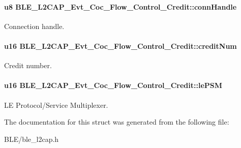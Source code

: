 \paragraph[{\texorpdfstring{conn\+Handle}{connHandle}}]{\setlength{\rightskip}{0pt plus 5cm}u8 B\+L\+E\+\_\+\+L2\+C\+A\+P\+\_\+\+Evt\+\_\+\+Coc\+\_\+\+Flow\+\_\+\+Control\+\_\+\+Credit\+::conn\+Handle}\hypertarget{struct_b_l_e___l2_c_a_p___evt___coc___flow___control___credit_aa290bb033e321b63549b47bf80be1311}{}\label{struct_b_l_e___l2_c_a_p___evt___coc___flow___control___credit_aa290bb033e321b63549b47bf80be1311}
Connection handle. 
\paragraph[{\texorpdfstring{credit\+Num}{creditNum}}]{\setlength{\rightskip}{0pt plus 5cm}u16 B\+L\+E\+\_\+\+L2\+C\+A\+P\+\_\+\+Evt\+\_\+\+Coc\+\_\+\+Flow\+\_\+\+Control\+\_\+\+Credit\+::credit\+Num}\hypertarget{struct_b_l_e___l2_c_a_p___evt___coc___flow___control___credit_ab43d71b91146498f464bbe13d648ae96}{}\label{struct_b_l_e___l2_c_a_p___evt___coc___flow___control___credit_ab43d71b91146498f464bbe13d648ae96}
Credit number. 
\paragraph[{\texorpdfstring{le\+P\+SM}{lePSM}}]{\setlength{\rightskip}{0pt plus 5cm}u16 B\+L\+E\+\_\+\+L2\+C\+A\+P\+\_\+\+Evt\+\_\+\+Coc\+\_\+\+Flow\+\_\+\+Control\+\_\+\+Credit\+::le\+P\+SM}\hypertarget{struct_b_l_e___l2_c_a_p___evt___coc___flow___control___credit_aa5799b0c8fb7703218eb94ef16c922a6}{}\label{struct_b_l_e___l2_c_a_p___evt___coc___flow___control___credit_aa5799b0c8fb7703218eb94ef16c922a6}
LE Protocol/\+Service Multiplexer. 

The documentation for this struct was generated from the following file\+:\begin{DoxyCompactItemize}
\item 
B\+L\+E/ble\+\_\+l2cap.\+h\end{DoxyCompactItemize}
